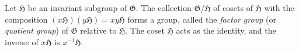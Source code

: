 Let $\mathfrak{H}$ be an invariant subgroup of $\mathfrak{G}$. The collection $\mathfrak{G}/\mathfrak{H}$ of cosets of $\mathfrak{H}$ with the composition $(x\mathfrak{H})(y\mathfrak{H}) = xy\mathfrak{H}$ forms a group, called the \textit{factor group} (or \textit{quotient group}) of $\mathfrak{G}$ relative to $\mathfrak{H}$. The coset $\mathfrak{H}$ acts as the identity, and the inverse of $x\mathfrak{H}$ is $x^{-1}\mathfrak{H}$.
